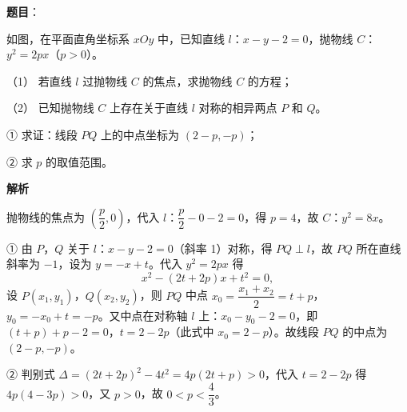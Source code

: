\begin{answer}

\textbf{题目}：

如图，在平面直角坐标系 \(xOy\) 中，已知直线 \(l\)：\(x-y-2=0\)，抛物线 \(C\)：\(y^{2}=2px\)（\(p>0\)）。

（1） 若直线 \(l\) 过抛物线 \(C\) 的焦点，求抛物线 \(C\) 的方程；

（2） 已知抛物线 \(C\) 上存在关于直线 \(l\) 对称的相异两点 \(P\) 和 \(Q\)。

① 求证：线段 \(PQ\) 上的中点坐标为 \((2-p,-p)\)；

② 求 \(p\) 的取值范围。
\nopagebreak[4]
\begin{center}\end{center}
\nopagebreak[4]
\textbf{解析}


抛物线的焦点为 \(\left(\dfrac{p}{2},0\right)\)，代入 \(l\)：\(\dfrac{p}{2}-0-2=0\)，得 \(p=4\)，故 \(C\)：\(y^{2}=8x\)。


① 由 \(P\)，\(Q\) 关于 \(l\)：\(x-y-2=0\)（斜率 1）对称，得 \(PQ\perp l\)，故 \(PQ\) 所在直线斜率为 \(-1\)，设为 \(y=-x+t\)。代入 \(y^{2}=2px\) 得
\nopagebreak[4]
\[
x^{2}-(2t+2p)x+t^{2}=0,
\]
设 \(P(x_{1},y_{1})\)，\(Q(x_{2},y_{2})\)，则 \(PQ\) 中点 \(x_{0}=\dfrac{x_{1}+x_{2}}{2}=t+p\)，\(y_{0}=-x_{0}+t=-p\)。又中点在对称轴 \(l\) 上：\(x_{0}-y_{0}-2=0\)，即 \((t+p)+p-2=0\)，\(t=2-2p\)（此式中 \(x_{0}=2-p\)）。故线段 \(PQ\) 的中点为 \((2-p,-p)\)。

② 判别式 \(\Delta=(2t+2p)^{2}-4t^{2}=4p(2t+p)>0\)，代入 \(t=2-2p\) 得 \(4p(4-3p)>0\)，又 \(p>0\)，故 \(0<p<\dfrac{4}{3}\)。



\end{answer}
